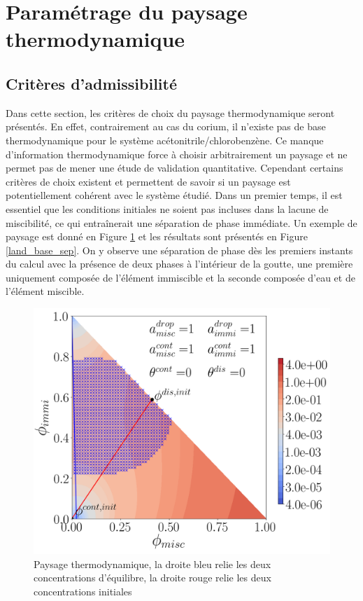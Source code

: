 \section{Paramétrage du paysage thermodynamique}
\subsection{Critères d'admissibilité} \label{subsec:critere_admi}
Dans cette section, les critères de choix du paysage thermodynamique seront présentés. En effet, contrairement au cas du corium, il n'existe pas de base thermodynamique pour le système acétonitrile/chlorobenzène. Ce manque d'information thermodynamique force à choisir arbitrairement un paysage et ne permet pas de mener une étude de validation quantitative. Cependant certains critères de choix existent et permettent de savoir si un paysage est potentiellement cohérent avec le système étudié.
Dans un premier temps, il est essentiel que les conditions initiales ne soient pas incluses dans la lacune de miscibilité, ce qui entraînerait une séparation de phase immédiate. Un exemple de paysage est donné en Figure \ref{fig:landscapebase} et les résultats sont présentés en Figure \ref{land_base_sep}. On y observe une séparation de phase dès les premiers instants du calcul avec la présence de deux phases à l'intérieur de la goutte, une première uniquement composée de l'élément immiscible et la seconde composée d'eau et de l'élément miscible.
 \begin{figure}[H]
 	\centering
 	\includegraphics[width=0.6\linewidth]{figure/landscape_base_chap3.png}
 	\caption[Paysage thermodynamique]{Paysage thermodynamique, la droite bleu relie les deux concentrations d'équilibre, la droite rouge relie les deux concentrations initiales}
 	\label{fig:landscapebase}
 \end{figure}
\vspace{-0.5cm}
